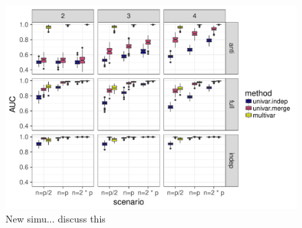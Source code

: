 
\begin{figure}[htbp!]
  \centering
  \includegraphics[width=\textwidth]{figures/res_simu_new}

  \caption{New simu... discuss this}
  \label{fig:simu_multi}
\end{figure}
